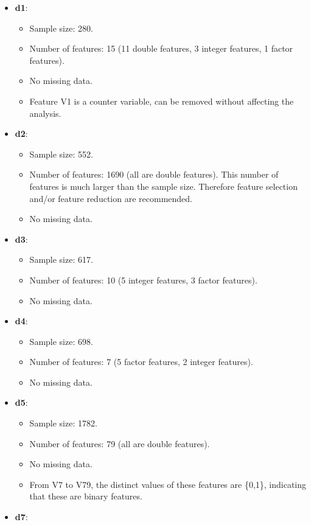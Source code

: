 \documentclass[
]{article}
\providecommand{\tightlist}{%
  \setlength{\itemsep}{0pt}\setlength{\parskip}{0pt}}
\begin{document}
\begin{itemize}
\tightlist
\item
  \textbf{d1}:

  \begin{itemize}
  \tightlist
  \item
    Sample size: 280.
  \item
    Number of features: 15 (11 double features, 3 integer features, 1 factor features).
  \item
    No missing data.
  \item
    Feature V1 is a counter variable, can be removed without affecting the analysis.
  \end{itemize}
\item
  \textbf{d2}:

  \begin{itemize}
  \tightlist
  \item
    Sample size: 552.
  \item
    Number of features: 1690 (all are double features). This number of features is much larger than the sample size. Therefore feature selection and/or feature reduction are recommended.
  \item
    No missing data.
  \end{itemize}
\item
  \textbf{d3}:

  \begin{itemize}
  \tightlist
  \item
    Sample size: 617.
  \item
    Number of features: 10 (5 integer features, 3 factor features).
  \item
    No missing data.
  \end{itemize}
\item
  \textbf{d4}:

  \begin{itemize}
  \tightlist
  \item
    Sample size: 698.
  \item
    Number of features: 7 (5 factor features, 2 integer features).
  \item
    No missing data.
  \end{itemize}
\item
  \textbf{d5}:

  \begin{itemize}
  \tightlist
  \item
    Sample size: 1782.
  \item
    Number of features: 79 (all are double features).
  \item
    No missing data.
  \item
    From V7 to V79, the distinct values of these features are \{0,1\}, indicating that these are binary features.
  \end{itemize}
\item
  \textbf{d7}:


\end{itemize}
\end{document}
